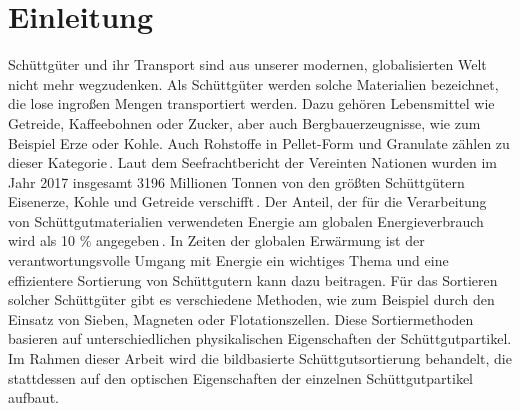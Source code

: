 \chapter{Einleitung}


Schüttgüter und ihr Transport sind aus unserer modernen, globalisierten Welt nicht mehr wegzudenken.
Als Schüttgüter werden solche Materialien bezeichnet, die lose ingroßen Mengen transportiert werden. 
Dazu gehören Lebensmittel wie Getreide, Kaffeebohnen oder Zucker, aber auch Bergbauerzeugnisse, wie zum Beispiel Erze oder Kohle. 
Auch Rohstoffe in Pellet-Form und Granulate zählen zu dieser Kategorie\,\cite[]{schulze2009}.
Laut dem Seefrachtbericht der Vereinten Nationen wurden im Jahr 2017 insgesamt 3196 Millionen Tonnen von den größten Schüttgütern Eisenerze, Kohle und Getreide verschifft\,\cite[Unterabschnitt 1.A.2]{unitednationsconferenceontradeanddevelopment2018}.
Der Anteil, der für die Verarbeitung von Schüttgutmaterialien verwendeten Energie am globalen Energieverbrauch wird als 10 \% angegeben\,\cite[Abschnitt 1.2]{duran2012sands}.
In Zeiten der globalen Erwärmung ist der verantwortungsvolle Umgang mit Energie ein wichtiges Thema 
und eine effizientere Sortierung von Schüttgutern kann dazu beitragen.
Für das Sortieren solcher Schüttgüter gibt es verschiedene Methoden, 
wie zum Beispiel durch den Einsatz von Sieben, Magneten oder Flotationszellen.
Diese Sortiermethoden basieren auf unterschiedlichen physikalischen Eigenschaften der Schüttgutpartikel.
Im Rahmen dieser Arbeit wird die bildbasierte Schüttgutsortierung behandelt, 
die stattdessen auf den optischen Eigenschaften der einzelnen Schüttgutpartikel aufbaut.
